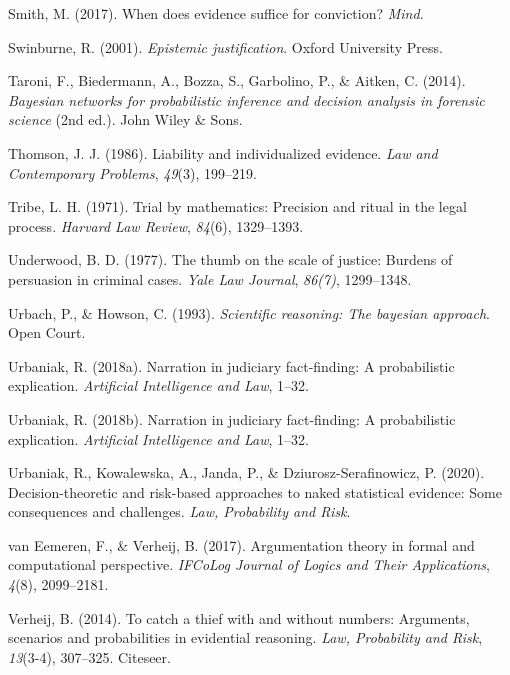 \documentclass[11pt,dvipsnames,enabledeprecatedfontcommands]{scrartcl}
\begin{document}
\hypertarget{ref-Smith_conviction_mind_2017}{}
Smith, M. (2017). When does evidence suffice for conviction?
\emph{Mind}.

\hypertarget{ref-Swinburne2001-SWIEJ}{}
Swinburne, R. (2001). \emph{Epistemic justification}. Oxford University
Press.

\hypertarget{ref-taroni2006bayesian}{}
Taroni, F., Biedermann, A., Bozza, S., Garbolino, P., \& Aitken, C.
(2014). \emph{Bayesian networks for probabilistic inference and decision
analysis in forensic science} (2nd ed.). John Wiley \& Sons.

\hypertarget{ref-Thomson86}{}
Thomson, J. J. (1986). Liability and individualized evidence. \emph{Law
and Contemporary Problems}, \emph{49}(3), 199--219.

\hypertarget{ref-tribe71}{}
Tribe, L. H. (1971). Trial by mathematics: Precision and ritual in the
legal process. \emph{Harvard Law Review}, \emph{84}(6), 1329--1393.

\hypertarget{ref-Underwood1977The-thumb-on-th}{}
Underwood, B. D. (1977). The thumb on the scale of justice: Burdens of
persuasion in criminal cases. \emph{Yale Law Journal}, \emph{86(7)},
1299--1348.

\hypertarget{ref-Urbach1993-HOWSRT}{}
Urbach, P., \& Howson, C. (1993). \emph{Scientific reasoning: The
bayesian approach}. Open Court.

\hypertarget{ref-urbaniak2018narration}{}
Urbaniak, R. (2018a). Narration in judiciary fact-finding: A
probabilistic explication. \emph{Artificial Intelligence and Law},
1--32.

\hypertarget{ref-Urbaniak2017Narration-in-ju}{}
Urbaniak, R. (2018b). Narration in judiciary fact-finding: A
probabilistic explication. \emph{Artificial Intelligence and Law},
1--32.

\hypertarget{ref-Urbaniak2020Decision}{}
Urbaniak, R., Kowalewska, A., Janda, P., \& Dziurosz-Serafinowicz, P.
(2020). Decision-theoretic and risk-based approaches to naked
statistical evidence: Some consequences and challenges. \emph{Law,
Probability and Risk}.

\hypertarget{ref-vanEemeren2017}{}
van Eemeren, F., \& Verheij, B. (2017). Argumentation theory in formal
and computational perspective. \emph{IFCoLog Journal of Logics and Their
Applications}, \emph{4}(8), 2099--2181.

\hypertarget{ref-verheij2014catch}{}
Verheij, B. (2014). To catch a thief with and without numbers:
Arguments, scenarios and probabilities in evidential reasoning.
\emph{Law, Probability and Risk}, \emph{13}(3-4), 307--325. Citeseer.
\end{document}
